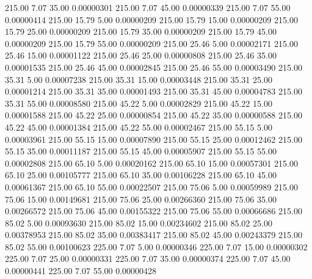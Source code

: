    215.00      7.07     35.00     0.00000301
    215.00      7.07     45.00     0.00000339
    215.00      7.07     55.00     0.00000414
    215.00     15.79      5.00     0.00000209
    215.00     15.79     15.00     0.00000209
    215.00     15.79     25.00     0.00000209
    215.00     15.79     35.00     0.00000209
    215.00     15.79     45.00     0.00000209
    215.00     15.79     55.00     0.00000209
    215.00     25.46      5.00     0.00002171
    215.00     25.46     15.00     0.00001122
    215.00     25.46     25.00     0.00000808
    215.00     25.46     35.00     0.00001535
    215.00     25.46     45.00     0.00002845
    215.00     25.46     55.00     0.00003490
    215.00     35.31      5.00     0.00007238
    215.00     35.31     15.00     0.00003448
    215.00     35.31     25.00     0.00001214
    215.00     35.31     35.00     0.00001493
    215.00     35.31     45.00     0.00004783
    215.00     35.31     55.00     0.00008580
    215.00     45.22      5.00     0.00002829
    215.00     45.22     15.00     0.00001588
    215.00     45.22     25.00     0.00000854
    215.00     45.22     35.00     0.00000588
    215.00     45.22     45.00     0.00001384
    215.00     45.22     55.00     0.00002467
    215.00     55.15      5.00     0.00003961
    215.00     55.15     15.00     0.00007890
    215.00     55.15     25.00     0.00012462
    215.00     55.15     35.00     0.00011187
    215.00     55.15     45.00     0.00005907
    215.00     55.15     55.00     0.00002808
    215.00     65.10      5.00     0.00020162
    215.00     65.10     15.00     0.00057301
    215.00     65.10     25.00     0.00105777
    215.00     65.10     35.00     0.00106228
    215.00     65.10     45.00     0.00061367
    215.00     65.10     55.00     0.00022507
    215.00     75.06      5.00     0.00059989
    215.00     75.06     15.00     0.00149681
    215.00     75.06     25.00     0.00266360
    215.00     75.06     35.00     0.00266572
    215.00     75.06     45.00     0.00155322
    215.00     75.06     55.00     0.00066686
    215.00     85.02      5.00     0.00093630
    215.00     85.02     15.00     0.00234602
    215.00     85.02     25.00     0.00378953
    215.00     85.02     35.00     0.00383417
    215.00     85.02     45.00     0.00243379
    215.00     85.02     55.00     0.00100623
    225.00      7.07      5.00     0.00000346
    225.00      7.07     15.00     0.00000302
    225.00      7.07     25.00     0.00000331
    225.00      7.07     35.00     0.00000374
    225.00      7.07     45.00     0.00000441
    225.00      7.07     55.00     0.00000428

